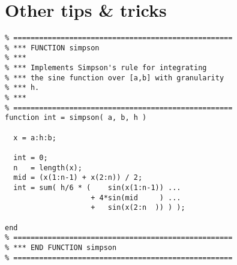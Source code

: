 %
% 
% 
% 
%
\newpage
\section{Other tips \& tricks}

\begin{listing}
\begin{verbatim}
% ===================================================
% *** FUNCTION simpson
% ***
% *** Implements Simpson's rule for integrating
% *** the sine function over [a,b] with granularity
% *** h.
% ***
% ===================================================
function int = simpson( a, b, h )

  x = a:h:b;

  int = 0;
  n   = length(x);
  mid = (x(1:n-1) + x(2:n)) / 2;
  int = sum( h/6 * (    sin(x(1:n-1)) ...
                    + 4*sin(mid     ) ...
                    +   sin(x(2:n  )) ) );

end
% ===================================================
% *** END FUNCTION simpson
% ===================================================
\end{verbatim}
\caption{Implementation of Simpson's rule for numerically integrating a function (here: \lstinline!sin!) between \lstinline!a! and \lstinline!b!. Note the usage of the vector notation to speed up the function. Also note that \lstinline!sin! is hardcoded into the routine, and needs to be changed each time we want to change the function. In case one is interested in calculating the integral of $f(x) = \exp(\sin(\frac{1}{x})) / \tan(\sqrt{1-x^4})$, this could get quite messy.}
\label{listing:simpson1}
\end{listing}


